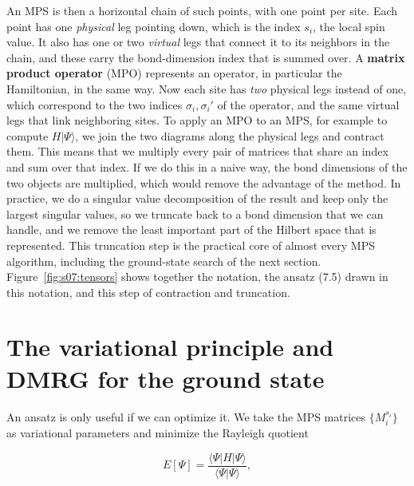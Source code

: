An MPS is then a horizontal chain of such points, with one point per site. Each point has one
\emph{physical} leg pointing down, which is the index $s_i$, the local spin value. It also has one or
two \emph{virtual} legs that connect it to its neighbors in the chain, and these carry the
bond-dimension index that is summed over. A \textbf{matrix product operator} (MPO) represents an
operator, in particular the Hamiltonian, in the same way. Now each site has \emph{two} physical
legs instead of one, which correspond to the two indices $\sigma_i,\sigma_i'$ of the operator, and the
same virtual legs that link neighboring sites. To apply an MPO to an MPS, for example to compute
$H|\Psi\rangle$, we join the two diagrams along the physical legs and contract them. This means that
we multiply every pair of matrices that share an index and sum over that index. If we do this in a
naive way, the bond dimensions of the two objects are multiplied, which would remove the advantage of
the method. In practice, we do a singular value decomposition of the result and keep only the largest
singular values, so we truncate back to a bond dimension that we can handle, and we remove
the least important part of the Hilbert space that is represented. This truncation step is the
practical core of almost every MPS algorithm, including the ground-state search of the next section.
Figure~\ref{fig:s07:tensors} shows together the notation, the ansatz (7.5) drawn in this notation,
and this step of contraction and truncation.



\section{The variational principle and DMRG for the ground state}

An ansatz is only useful if we can optimize it. We take the MPS matrices $\{M_i^{s_i}\}$ as
variational parameters and minimize the Rayleigh quotient

\begin{equation}
E[\Psi] = \frac{\langle \Psi | H | \Psi \rangle}{\langle \Psi | \Psi \rangle},
\end{equation}

